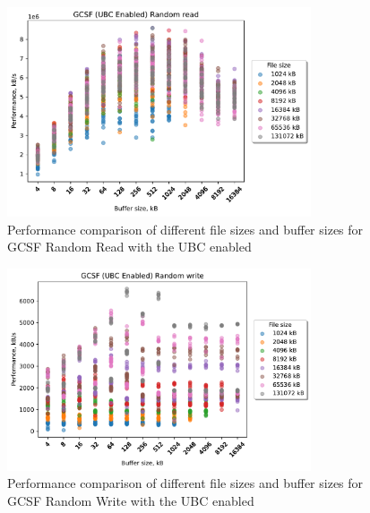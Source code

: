 \begin{figure}[!htb]
	\label{fig:bench_gcsf_ubc_scatter_rnd_read}
	\begin{center}
		\includegraphics[width=0.8\textwidth]{figures.nosync/benchmarking/GCSF/scatter-UBC Enabled-Random read.pdf}
	\end{center}
	\caption[Comparison of Random Read performance for file size and buffer size for GCSF with the UBC enabled]{Performance comparison of different file sizes and buffer sizes for GCSF Random Read with the UBC enabled}
\end{figure}
\begin{figure}[!htb]
	\label{fig:bench_gcsf_ubc_scatter_rnd_write}
	\begin{center}
		\includegraphics[width=0.8\textwidth]{figures.nosync/benchmarking/GCSF/scatter-UBC Enabled-Random write.pdf}
	\end{center}
	\caption[Comparison of Random Write performance for file size and buffer size for GCSF with the UBC enabled]{Performance comparison of different file sizes and buffer sizes for GCSF Random Write with the UBC enabled}
\end{figure}
\clearpage



